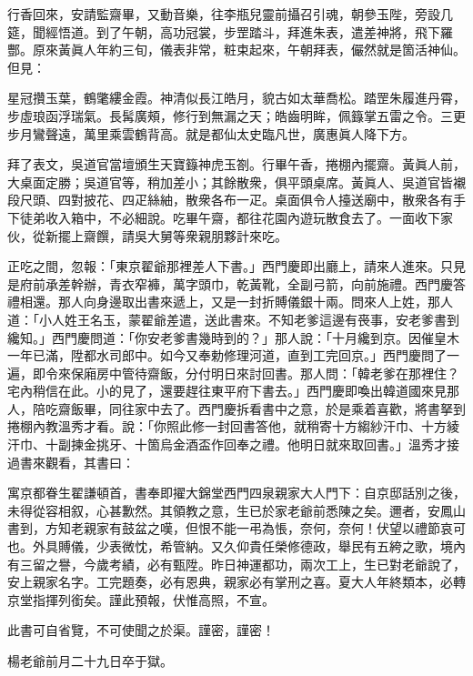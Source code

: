 行香回來，安請監齋畢，又動音樂，往李瓶兒靈前攝召引魂，朝參玉陛，旁設几筵，聞經悟道。到了午朝，高功冠裳，步罡踏斗，拜進朱表，遣差神將，飛下羅酆。原來黃眞人年約三旬，儀表非常，粧束起來，午朝拜表，儼然就是箇活神仙。但見：

\begin{myquote} 
星冠攢玉葉，鶴氅縷金霞。神清似長江皓月，貌古如太華喬松。踏罡朱履進丹霄，步虛琅函浮瑞氣。長髯廣頰，修行到無漏之天；皓齒明眸，佩籙掌五雷之令。三更步月鸞聲遠，萬里乘雲鶴背高。就是都仙太史臨凡世，廣惠眞人降下方。
\end{myquote} 

拜了表文，吳道官當壇頒生天寶籙神虎玉劄。行畢午香，捲棚內擺齋。黃眞人前，大桌面定勝；吳道官等，稍加差小；其餘散衆，俱平頭桌席。黃眞人、吳道官皆襯段尺頭、四對披花、四疋絲紬，散衆各布一疋。桌面俱令人擡送廟中，散衆各有手下徒弟收入箱中，不必細說。吃畢午齋，都往花園內遊玩散食去了。一面收下家伙，從新擺上齋饌，請吳大舅等衆親朋夥計來吃。

正吃之間，忽報：「東京翟爺那裡差人下書。」西門慶即出廳上，請來人進來。只見是府前承差幹辦，青衣窄褲，萬字頭巾，乾黃靴，全副弓箭，向前施禮。西門慶答禮相還。那人向身邊取出書來遞上，又是一封折賻儀銀十兩。問來人上姓，那人道：「小人姓王名玉，蒙翟爺差遣，送此書來。不知老爹這邊有䘮事，安老爹書到纔知。」西門慶問道：「你安老爹書幾時到的？」那人說：「十月纔到京。因催皇木一年已滿，陞都水司郎中。如今又奉勅修理河道，直到工完回京。」西門慶問了一遍，即令來保廂房中管待齋飯，分付明日來討回書。那人問：「韓老爹在那裡住？宅內稍信在此。小的見了，還要趕往東平府下書去。」西門慶即喚出韓道國來見那人，陪吃齋飯畢，同往家中去了。西門慶拆看書中之意，於是乘着喜歡，將書拏到捲棚內教溫秀才看。{}說：「你照此修一封回書答他，就稍寄十方縐紗汗巾、十方綾汗巾、十副揀金挑牙、十箇烏金酒盃作回奉之禮。他明日就來取回書。」溫秀才接過書來觀看，其書曰：

\begin{myquote}[\markfont]
寓京都眷生翟謙頓首，書奉即擢大錦堂西門四泉親家大人門下：自京邸話別之後，未得從容相叙，心甚歉然。其領教之意，生已於家老爺前悉陳之矣。邇者，安鳳山書到，方知老親家有鼓盆之嘆，但恨不能一弔為悵，奈何，奈何！伏望以禮節哀可也。外具賻儀，少表微忱，希管納。又久仰貴任榮修德政，舉民有五絝之歌，境內有三留之譽，今歲考績，必有甄陞。昨日神運都功，兩次工上，生已對老爺說了，安上親家名字。工完題奏，必有恩典，親家必有掌刑之喜。夏大人年終類本，必轉京堂指揮列銜矣。謹此預報，伏惟高照，不宣。

{}此書可自省覽，不可使聞之於渠。謹密，謹密！

{}

楊老爺前月二十九日卒于獄。{}

\end{myquote}

